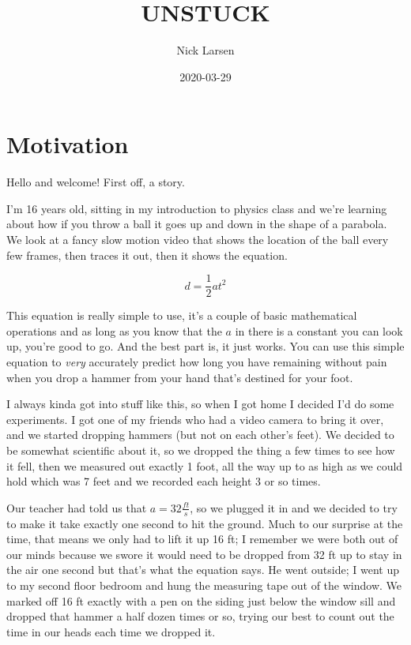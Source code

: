 \documentclass[
]{book}
\title{UNSTUCK}
\author{Nick Larsen}
\date{2020-03-29}
\begin{document}
\maketitle

{
\setcounter{tocdepth}{1}
\tableofcontents
}
\hypertarget{motivation}{%
\chapter*{Motivation}\label{motivation}}

Hello and welcome! First off, a story.

I'm 16 years old, sitting in my introduction to physics class and we're learning about how if you throw a ball it goes up and down in the shape of a parabola. We look at a fancy slow motion video that shows the location of the ball every few frames, then traces it out, then it shows the equation.

\[d = \frac{1}{2}at^2\]

This equation is really simple to use, it's a couple of basic mathematical operations and as long as you know that the \(a\) in there is a constant you can look up, you're good to go. And the best part is, it just works. You can use this simple equation to \emph{very} accurately predict how long you have remaining without pain when you drop a hammer from your hand that's destined for your foot.

I always kinda got into stuff like this, so when I got home I decided I'd do some experiments. I got one of my friends who had a video camera to bring it over, and we started dropping hammers (but not on each other's feet). We decided to be somewhat scientific about it, so we dropped the thing a few times to see how it fell, then we measured out exactly 1 foot, all the way up to as high as we could hold which was 7 feet and we recorded each height 3 or so times.

Our teacher had told us that \(a = 32\frac{ft}{s}\), so we plugged it in and we decided to try to make it take exactly one second to hit the ground. Much to our surprise at the time, that means we only had to lift it up 16 ft; I remember we were both out of our minds because we swore it would need to be dropped from 32 ft up to stay in the air one second but that's what the equation says. He went outside; I went up to my second floor bedroom and hung the measuring tape out of the window. We marked off 16 ft exactly with a pen on the siding just below the window sill and dropped that hammer a half dozen times or so, trying our best to count out the time in our heads each time we dropped it.
\end{document}
